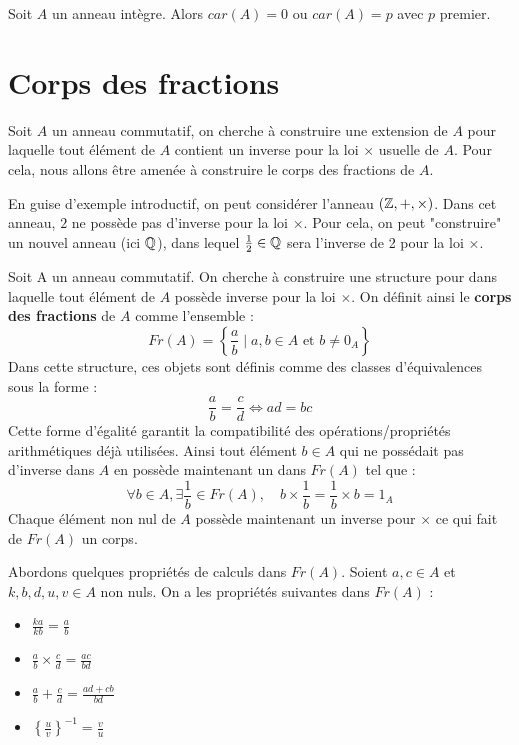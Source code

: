 \begin{theorem}
    Soit $A$ un anneau intègre. Alors $car(A) = 0$ ou $car(A) = p$ avec $p$ premier. 
\end{theorem}


\section{Corps des fractions}

Soit $A$ un anneau commutatif, on cherche à construire une extension de $A$ pour laquelle tout élément de $A$ 
contient un inverse pour la loi $\times$ usuelle de $A$. 
Pour cela, nous allons être amenée à construire le corps des fractions de $A$. 

\vspace{0.3cm}

En guise d'exemple introductif, on peut considérer l'anneau $(\mathbb{Z},+,\times)$. 
Dans cet anneau, $2$ ne possède pas d'inverse pour la loi $\times$. 
Pour cela, on peut "construire" un nouvel anneau (ici $\mathbb{Q}$), dans lequel $ \frac{1}{2} \in \mathbb{Q}$ sera l'inverse de 2 
pour la loi $\times$. 

\begin{proposition}
    Soit A un anneau commutatif. On cherche à construire une structure pour dans laquelle tout élément de $A$ possède 
    inverse pour la loi $\times$. 
    On définit ainsi le \textbf{corps des fractions} de $A$ comme l'ensemble : 
        \[ \boxed{ Fr(A) = \left\{ \frac{a}{b} \; | \; a,b \in A \text{ et } b \not = 0_A \right\} } \]
    Dans cette structure, ces objets sont définis comme des classes d'équivalences sous la forme : 
        \[ \frac{a}{b} = \frac{c}{d} \iff ad = bc \] 
    Cette forme d'égalité garantit la compatibilité des opérations/propriétés arithmétiques déjà utilisées. 
    Ainsi tout élément $b \in A$ qui ne possédait pas d'inverse dans $A$ en possède maintenant un dans $Fr(A)$ tel que :
        \[ \forall b \in A, \exists \frac{1}{b} \in Fr(A), \quad b \times \frac{1}{b} = \frac{1}{b} \times b = 1_A \] 
    Chaque élément non nul de $A$ possède maintenant un inverse pour $\times$ ce qui fait de $Fr(A)$ un corps. 
\end{proposition}

\begin{prop}[Calculs]
    Abordons quelques propriétés de calculs dans $Fr(A)$. Soient $a,c \in A$ et $k,b,d,u,v \in A$ non nuls. 
    On a les propriétés suivantes dans $Fr(A)$ : 
    \begin{itemize}
        \item $ \frac{ka}{kb} = \frac{a}{b} $ 
        \item $ \frac{a}{b} \times \frac{c}{d} = \frac{ac}{bd} $ 
        \item $ \frac{a}{b} + \frac{c}{d} = \frac{ad + cb}{bd} $ 
        \item $ \left\{ \frac{u}{v} \right\} ^{-1} = \frac{v}{u} $
    \end{itemize}
\end{prop}

